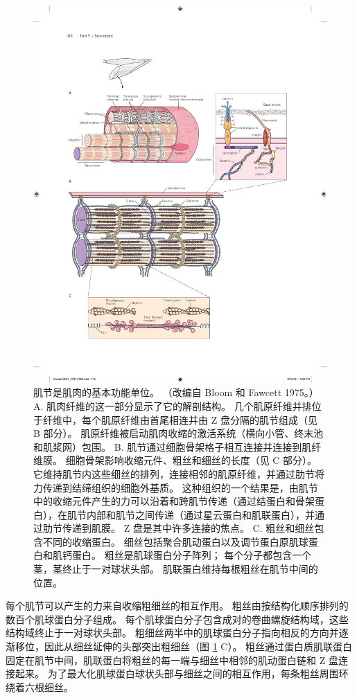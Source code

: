 \begin{figure}[htbp]
	\centering
	\includegraphics[width=0.9\linewidth]{chap31/fig_31_9}
	\caption{肌节是肌肉的基本功能单位。 （改编自 Bloom 和 Fawcett 1975。） A. 肌肉纤维的这一部分显示了它的解剖结构。 几个肌原纤维并排位于纤维中，每个肌原纤维由首尾相连并由 Z 盘分隔的肌节组成（见 B 部分）。 肌原纤维被启动肌肉收缩的激活系统（横向小管、终末池和肌浆网）包围。 B. 肌节通过细胞骨架格子相互连接并连接到肌纤维膜。 细胞骨架影响收缩元件、粗丝和细丝的长度（见 C 部分）。 它维持肌节内这些细丝的排列，连接相邻的肌原纤维，并通过肋节将力传递到结缔组织的细胞外基质。 这种组织的一个结果是，由肌节中的收缩元件产生的力可以沿着和跨肌节传递（通过结蛋白和骨架蛋白），在肌节内部和肌节之间传递（通过星云蛋白和肌联蛋白），并通过肋节传递到肌膜。 Z 盘是其中许多连接的焦点。 C. 粗丝和细丝包含不同的收缩蛋白。 细丝包括聚合肌动蛋白以及调节蛋白原肌球蛋白和肌钙蛋白。 粗丝是肌球蛋白分子阵列； 每个分子都包含一个茎，茎终止于一对球状头部。 肌联蛋白维持每根粗丝在肌节中间的位置。}
	\label{fig:31_9}
\end{figure}


每个肌节可以产生的力来自收缩粗细丝的相互作用。 粗丝由按结构化顺序排列的数百个肌球蛋白分子组成。 每个肌球蛋白分子包含成对的卷曲螺旋结构域，这些结构域终止于一对球状头部。 粗细丝两半中的肌球蛋白分子指向相反的方向并逐渐移位，因此从细丝延伸的头部突出粗细丝（图 \ref{fig:31_9} C）。 粗丝通过蛋白质肌联蛋白固定在肌节中间，肌联蛋白将粗丝的每一端与细丝中相邻的肌动蛋白链和 Z 盘连接起来。 为了最大化肌球蛋白球状头部与细丝之间的相互作用，每条粗丝周围环绕着六根细丝。

